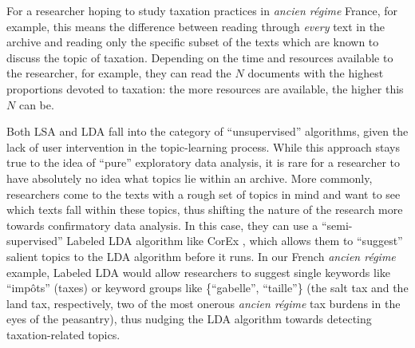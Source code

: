 \documentclass[11pt]{article}
\begin{document}

For a researcher hoping to study taxation practices in \textit{ancien régime} France, for example, this means the difference between reading through \textit{every} text in the archive and reading only the specific subset of the texts which are known to discuss the topic of taxation. Depending on the time and resources available to the researcher, for example, they can read the $N$ documents with the highest proportions devoted to taxation: the more resources are available, the higher this $N$ can be.

Both LSA and LDA fall into the category of ``unsupervised'' algorithms, given the lack of user intervention in the topic-learning process. While this approach stays true to the idea of ``pure'' exploratory data analysis, it is rare for a researcher to have absolutely no idea what topics lie within an archive. More commonly, researchers come to the texts with a rough set of topics in mind and want to see which texts fall within these topics, thus shifting the nature of the research more towards confirmatory data analysis. In this case, they can use a ``semi-supervised'' Labeled LDA algorithm like CorEx \citep{gallagher_anchored_2017}, which allows them to ``suggest'' salient topics to the LDA algorithm before it runs. In our French \textit{ancien régime} example, Labeled LDA would allow researchers to suggest single keywords like ``impôts'' (taxes) or keyword groups like \{``gabelle'', ``taille''\} (the salt tax and the land tax, respectively, two of the most onerous \textit{ancien régime} tax burdens in the eyes of the peasantry), thus nudging the LDA algorithm towards detecting taxation-related topics.

\end{document}
